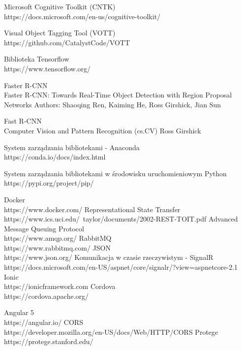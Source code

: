 \begin{thebibliography}{1}
 Microsoft Cognitive Toolkit (CNTK)
\\
https://docs.microsoft.com/en-us/cognitive-toolkit/

 Visual Object Tagging Tool (VOTT)
\\
https://github.com/CatalystCode/VOTT

 Biblioteka Tensorflow
\\
https://www.tensorflow.org/

 Faster R-CNN
\\
Faster R-CNN: Towards Real-Time Object Detection with Region Proposal Networks
Authors: Shaoqing Ren, Kaiming He, Ross Girshick, Jian Sun

 Fast R-CNN
\\
Computer Vision and Pattern Recognition (cs.CV)
Ross Girshick

 System zarządzania bibliotekami - Anaconda
\\
https://conda.io/docs/index.html

 System zarządzania bibliotekami w środowisku uruchomieniowym Python
\\
https://pypi.org/project/pip/


 Docker
\\
https://www.docker.com/
 Representational State Transfer
\\
https://www.ics.uci.edu/~taylor/documents/2002-REST-TOIT.pdf
Advanced Message Queuing Protocol
\\
https://www.amqp.org/
 RabbitMQ
\\
https://www.rabbitmq.com/
 JSON
\\
https://www.json.org/
 Komunikacja w czasie rzeczywistym - SignalR
\\
https://docs.microsoft.com/en-US/aspnet/core/signalr/?view=aspnetcore-2.1
 Ionic
\\
https://ionicframework.com
 Cordova
\\
https://cordova.apache.org/

 Angular 5
\\
https://angular.io/
CORS
\\
https://developer.mozilla.org/en-US/docs/Web/HTTP/CORS
Protege
\\
https://protege.stanford.edu/


\end{thebibliography}
